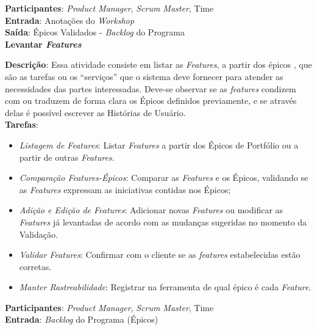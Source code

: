   \textbf{Participantes}: \textit{Product Manager}, \textit{Scrum Master}, Time \\

  \textbf{Entrada}: Anotações do \textit{Workshop} \\

  \textbf{Saída}: Épicos Validados - \textit{Backlog} do Programa\\

\textbf{Levantar \textit{Features}}

\textbf{Descrição}: Essa atividade consiste em listar as \textit{Features}, a partir dos épicos ,
que são as tarefas ou os “serviços” que o sistema deve fornecer para atender as necessidades das partes interessadas.
Deve-se observar se as \textit{features} condizem com ou traduzem de forma clara os Épicos
definidos previamente, e se através delas é possível escrever as Histórias de Usuário.\\

\textbf{Tarefas}:

  \begin{itemize}
   \item \indent \textit{Listagem de \textit{Features}}:  Listar \textit{Features} a partir dos Épicos de Portfólio ou a partir de outras \textit{Features}.
   
   \item \indent \textit{Comparação \textit{Features}-Épicos}: Comparar as \textit{Features} e os Épicos, validando se as \textit{Features} expressam as iniciativas contidas nos Épicos;

   \item \indent \textit{Adição e Edição de \textit{Features}}: Adicionar novas \textit{Features} ou modificar as \textit{Features} já levantadas de acordo com as mudanças sugeridas no momento da Validação.

   \item \indent \textit{Validar \textit{Features}}: Confirmar com o cliente se as \textit{features} estabelecidas estão corretas. 
   
   \item \indent \textit{Manter Rastreabilidade}: Registrar na ferramenta de qual épico é cada \textit{Feature}.
   \end{itemize}

\textbf{Participantes}: \textit{Product Manager}, \textit{Scrum Master}, Time \\

\textbf{Entrada}: \textit{Backlog} do Programa (Épicos) \\

